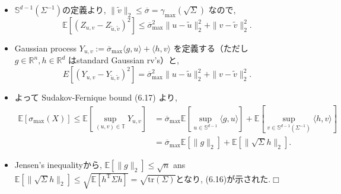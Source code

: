 \documentclass[unicode,aspectratio=169,11pt]{beamer}
\def\qed{\hfill $\Box$}
\newcommand{\ex}{\mathbb{E}}
\newcommand{\bb}{\mathbb}
\newcommand{\tr}{\mathrm{T}}
\newcommand{\trace}{\mathrm{tr}}
\begin{document}
\begin{frame}
  \begin{itemize}
    \item $\bb{S}^{d-1}(\Sigma^{-1})$の定義より, $\|\tilde{v}\|_2 \le \overline{\sigma} = \gamma_{\max}(\sqrt{\Sigma})$ なので,
            \[ \ex[(Z_{u,v} - Z_{\tilde{u}, \tilde{v}})^2] \le \overline{\sigma}^2_{\max} \|u-\tilde{u}\|_2^2 + \|v-\tilde{v}\|_2^2.\]
    \item Gaussian process $Y_{u,v} := \overline{\sigma}_{\max}\langle g, u\rangle + \langle h, v\rangle$ を定義する（ただし $g\in\bb{R}^n, h \in \bb{R}^d$ はstandard Gaussian rv's）と,
            \[ E[(Y_{u,v} - Y_{\tilde{u},\tilde{v}})^2] = \overline{\sigma}^2_{\max}\|u-\tilde{u}\|_2^2 + \|v - \tilde{v}\|_2^2. \]
    \item よって Sudakov-Fernique bound (6.17) より,
    \begin{align*}
      \ex[\sigma_{\max}(X)] \le \ex\left[ \sup_{(u,v) \in \bb{T}} Y_{u,v}\right]
      &= \overline{\sigma}_{\max}\ex\left[\sup_{u \in\bb{S}^{d-1}}\langle g, u \rangle\right] + \ex\left[ \sup_{v \in \bb{S}^{d-1}(\Sigma^{-1})}\langle h, v\rangle \right]\\
      &= \overline{\sigma}_{\max}\ex[\|g\|_2] + \ex[\|\sqrt{\Sigma}h\|_2].
    \end{align*}
    \item Jensen's inequalityから, $\ex[\|g\|_2] \le \sqrt{n}$ ans $\ex[\|\sqrt{\Sigma}h\|_2] \le \sqrt{\ex[h^\tr \Sigma h]} = \sqrt{\trace(\Sigma)}$となり, (6.16)が示された.\qed
  \end{itemize}
\end{frame}
\end{document}
